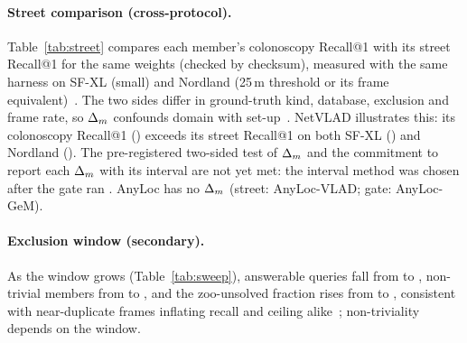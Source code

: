\paragraph{Street comparison (cross-protocol).} Table~\ref{tab:street}
compares each member's colonoscopy Recall@1 with its street Recall@1 for the
same weights (checked by checksum), measured with the same harness on SF-XL
(small) and Nordland (25\,m threshold or its frame
equivalent)~\cite{berton2022deep}. The two sides differ in ground-truth
kind, database, exclusion and frame rate, so $\Delta_m$ confounds domain with
set-up~\cite{schubert2021makes}. NetVLAD illustrates this: its colonoscopy
Recall@1 () exceeds its street Recall@1 on both SF-XL
() and Nordland ().
The pre-registered two-sided test of $\Delta_m$ and the commitment to report
each $\Delta_m$ with its interval are not yet met: the interval method was chosen
after the gate ran . AnyLoc has no $\Delta_m$ (street: AnyLoc-VLAD;
gate: AnyLoc-GeM).

\paragraph{Exclusion window (secondary).} As the window grows
(Table~\ref{tab:sweep}), answerable queries fall from  to
, non-trivial members from  to
, and the zoo-unsolved fraction rises from
 to , consistent with near-duplicate frames
inflating recall and ceiling alike~\cite{morlana2021selfsupervised};
non-triviality depends on the window.
